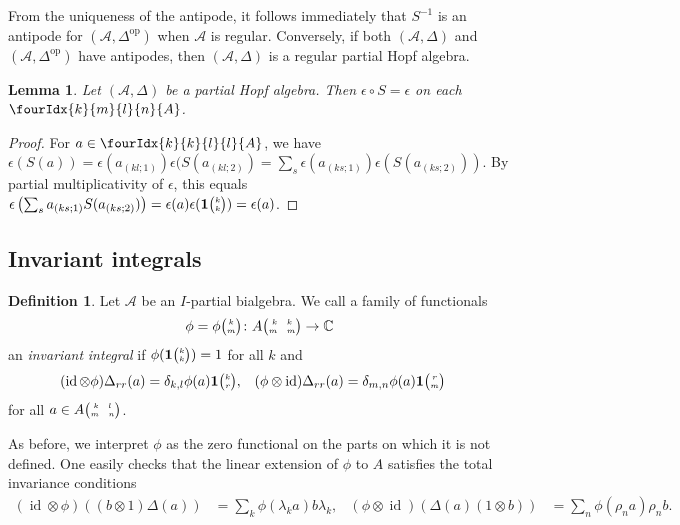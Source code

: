 \documentclass[10pt]{article}
\DeclareMathOperator{\id}{id}
\DeclareMathOperator{\op}{\mathrm{op}}
\newcommand{\C}{\mathbb{C}}
\newcommand{\Grt}[3]{#1{\tiny {\begin{pmatrix} #2\\#3\end{pmatrix}}}}
\newcommand{\UnitC}[2]{\Grt{\mathbf{1}}{#1}{#2}}
\newcommand{\pmat}[4]{{\tiny \begin{pmatrix} #1 \quad #2 \\ #3 \quad #4\end{pmatrix}}}
\newcommand{\Gr}[5]{\fourIdx{#2}{#4}{#3}{#5}{#1}}%
\newtheorem{Lem}[Theorem]{Lemma}
\theoremstyle{definition}
\newtheorem{Def}[Theorem]{Definition}
\newcommand{\phic}[2]{\Grt{\phi}{#1}{#2}}
\numberwithin{equation}{section}
\begin{document}
From the uniqueness of the antipode, it follows immediately that $S^{-1}$ is an antipode for $(\mathscr{A},\Delta^{\op})$ when $\mathscr{A}$ is regular. Conversely, if both $(\mathscr{A},\Delta)$ and $(\mathscr{A},\Delta^{\op})$ have antipodes, then $(\mathscr{A},\Delta)$ is a regular partial Hopf algebra. 

\begin{Lem}\label{LemCoAnt} Let $(\mathscr{A},\Delta)$ be a partial Hopf algebra. Then $\epsilon\circ S = \epsilon$ on each $\Gr{A}{k}{l}{m}{n}$.
\end{Lem}

\begin{proof} For $a\in \Gr{A}{k}{l}{k}{l}$, we have $\epsilon(S(a)) = \epsilon(a_{(kl;1)})\epsilon(S(a_{(kl;2)}) = \sum_s \epsilon(a_{(ks;1)})\epsilon(S(a_{(ks;2)}))$. By partial multiplicativity of $\epsilon$, this equals  $\epsilon\left( \sum_s a_{(ks;1)}S(a_{(ks;2)})\right) = \epsilon(a)\epsilon(\UnitC{k}{k})= \epsilon(a)$. 
\end{proof} 

\subsection{Invariant integrals}

\begin{Def}
  Let $\mathscr{A}$ be an $I$-partial bialgebra.  We call a family of
  functionals
\begin{align} \label{eq:functionals}
  \phi = \phic{k}{m} \colon A\pmat{k}{k}{m}{m} \to \C
\end{align}
an \emph{invariant} \emph{integral} if
 $\phi(\UnitC{k}{k})=1$ for all $k$ and
\begin{align}
  \label{eq:integral}
   (\id \otimes \phi)\Delta_{rr}(a) 
&= \delta_{k,l} \phi(a)
  \UnitC{k}{r}, &   (\phi \otimes
  \id)\Delta_{rr}(a)&= \delta_{m,n} \phi(a) \UnitC{r}{m}
\end{align}
 for all $a \in A\pmat{k}{l}{m}{n}$. 
\end{Def}


As before, we interpret $\phi$ as the zero functional on the parts on which it is not defined. One easily checks that the linear extension of $\phi$ to $A$ satisfies the total invariance conditions \begin{align*}
(\id\otimes \phi)((b\otimes 1)\Delta(a)) &= \sum_{k}\phi(\lambda_{k}a)b\lambda_k,&  (\phi\otimes \id)(\Delta(a)(1\otimes b)) &= \sum_{n}
\phi(\rho_{n} a)\rho_n b.\end{align*}
\end{document}
